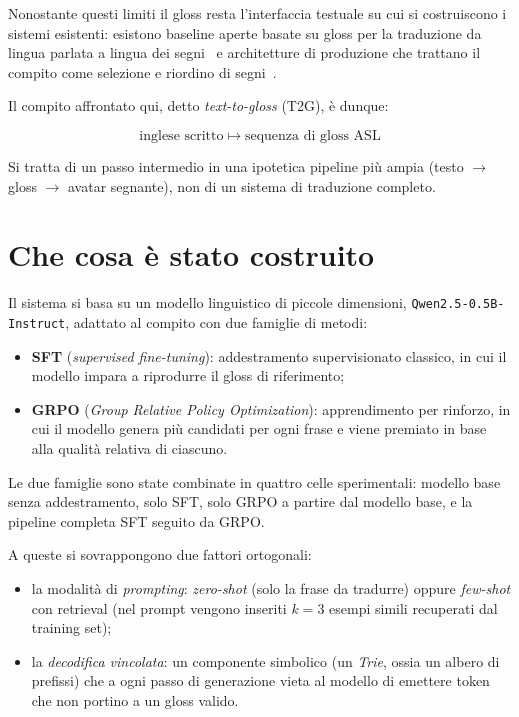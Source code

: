 Nonostante questi limiti il gloss resta l'interfaccia testuale su cui si
costruiscono i sistemi esistenti: esistono baseline aperte basate su gloss per
la traduzione da lingua parlata a lingua dei segni~\cite{moryossef2023baseline} e
architetture di produzione che trattano il compito come selezione e riordino di
segni~\cite{walsh2024select}.

Il compito affrontato qui, detto \emph{text-to-gloss} (T2G), è dunque:

\begin{equation}
  \text{inglese scritto} \;\longmapsto\; \text{sequenza di gloss ASL}
\end{equation}

Si tratta di un passo intermedio in una ipotetica pipeline più ampia
(testo $\to$ gloss $\to$ avatar segnante), non di un sistema di traduzione
completo.

\section{Che cosa è stato costruito}

Il sistema si basa su un modello linguistico di piccole dimensioni,
\texttt{Qwen2.5-0.5B-Instruct}, adattato al compito con due famiglie di metodi:

\begin{itemize}
  \item \textbf{SFT} (\emph{supervised fine-tuning}): addestramento supervisionato
        classico, in cui il modello impara a riprodurre il gloss di riferimento;
  \item \textbf{GRPO} (\emph{Group Relative Policy Optimization}): apprendimento
        per rinforzo, in cui il modello genera più candidati per ogni frase e
        viene premiato in base alla qualità relativa di ciascuno.
\end{itemize}

Le due famiglie sono state combinate in quattro celle sperimentali: modello base
senza addestramento, solo SFT, solo GRPO a partire dal modello base, e la
pipeline completa SFT seguito da GRPO.

A queste si sovrappongono due fattori ortogonali:

\begin{itemize}
  \item la modalità di \emph{prompting}: \emph{zero-shot} (solo la frase da
        tradurre) oppure \emph{few-shot} con retrieval (nel prompt vengono
        inseriti $k=3$ esempi simili recuperati dal training set);
  \item la \emph{decodifica vincolata}: un componente simbolico (un
        \emph{Trie}, ossia un albero di prefissi) che a ogni passo di generazione
        vieta al modello di emettere token che non portino a un gloss valido.
\end{itemize}


